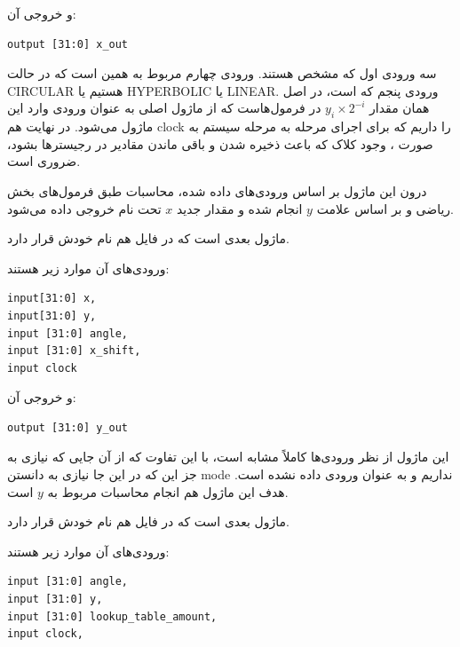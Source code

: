 \documentclass[12pt,titlepage,a4page , tikz , multi,table , svgnames,xcdraw]{article}
\begin{document}
و خروجی آن:

\begin{latin}
\begin{verbatim}
output [31:0] x_out
\end{verbatim}
\end{latin}

سه ورودی اول که مشخص هستند. ورودی چهارم مربوط به همین است که در حالت CIRCULAR هستیم یا HYPERBOLIC یا LINEAR. ورودی پنجم که  است، در اصل همان مقدار $y_i \times 2^{-i}$ در فرمول‌هاست که از ماژول اصلی به عنوان ورودی وارد این ماژول می‌شود. در نهایت هم clock را داریم که برای اجرای مرحله به مرحله سیستم به صورت ، وجود کلاک که باعث ذخیره شدن و باقی ماندن مقادیر در رجیسترها بشود، ضروری است.

درون این ماژول بر اساس ورودی‌های داده شده، محاسبات طبق فرمول‌های بخش ریاضی و بر اساس علامت $y$ انجام شده و مقدار جدید $x$ تحت نام  خروجی داده می‌شود.

\hrulefill
 

ماژول بعدی  است که در فایل هم نام خودش قرار دارد.

 
 ورودی‌های آن موارد زیر هستند:

\begin{latin}
\begin{verbatim}
input[31:0] x,
input[31:0] y,
input [31:0] angle,
input [31:0] x_shift,
input clock
\end{verbatim}
\end{latin}

و خروجی آن:

\begin{latin}
\begin{verbatim}
output [31:0] y_out
\end{verbatim}
\end{latin}

این ماژول از نظر ورودی‌ها کاملاً مشابه  است، با این تفاوت که از آن جایی که نیازی به جز این که در این جا نیازی به دانستن mode نداریم و به عنوان ورودی داده نشده است. هدف این ماژول هم انجام محاسبات مربوط به $y$ است.

\hrulefill


ماژول بعدی  است که در فایل هم نام خودش قرار دارد.

 
 ورودی‌های آن موارد زیر هستند:

\begin{latin}
\begin{verbatim}
input [31:0] angle,
input [31:0] y,
input [31:0] lookup_table_amount,
input clock,
\end{verbatim}
\end{latin}
\end{document}
